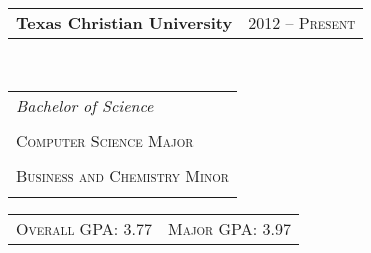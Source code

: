 \documentclass[10pt]{article} %
\begin{document}
\begin{minipage}[t]{0.44\textwidth}
\begin{tabular}{l r} 
\textbf{Texas Christian University} & 2012 -- \textsc{Present} \\ 
\end{tabular} \hfill \\
\begin{tabular}{l} 
\textit{Bachelor of Science} \\ \hfill \\
\textsc{Computer Science Major}\\ \hfill \\
\textsc{Business and Chemistry Minor}  \\ \hfill \\
\end{tabular}
\begin{tabular}{l r}
\textsc{Overall GPA: 3.77} &  \textsc{Major GPA: 3.97} \\

\end{tabular}\\[10pt]


\end{minipage}
\end{document}
